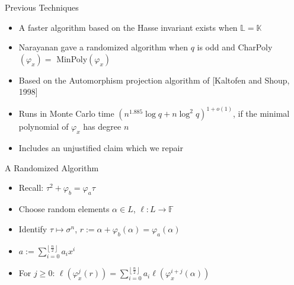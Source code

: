 \documentclass{beamer}
\newcommand{\f}{\mathbb{F}}
\begin{document}
\begin{frame}{Previous Techniques}
\begin{itemize}

\item A faster algorithm based on the Hasse invariant exists when $\mathbb{L} = \mathbb{K}$
\item Narayanan gave a randomized algorithm when $q$ is odd and  CharPoly$(\varphi_x) = $ MinPoly$(\varphi_x)$
\item Based on the Automorphism projection algorithm of [Kaltofen and Shoup, 1998]
\item Runs in Monte Carlo time $(n^{1.885} \log q + n \log^2 q)^{1+o(1)}$,
  if the minimal polynomial of $\varphi_x$ has degree $n$
\item Includes an unjustified claim which we repair
\end{itemize}
\end{frame}





\begin{frame}{A Randomized Algorithm}

\begin{itemize}
    \item Recall: $\tau^2 + \varphi_b = \varphi_a \tau$
    \item Choose random elements $\alpha \in L$, $\ell : L \to \f$
    \item Identify $\tau \mapsto \sigma^n$, $r := \alpha + \varphi_b(\alpha) = \varphi_a(\alpha)$
    \item $a := \sum_{i=0}^{\left\lfloor \frac{n}{2} \right\rfloor}a_ix^i$
    \item For $j \geq 0$: $\ell(\varphi_x^j(r)) = \sum_{i = 0}^{\left\lfloor{\frac{n}{2}} \right\rfloor}a_i\ell(\varphi_x^{i+j}(\alpha))$
    \end{itemize}
    
    \end{frame}
    
\end{document}
